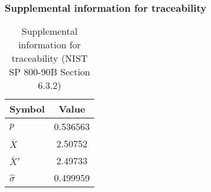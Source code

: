\documentclass[a3paper,xelatex,english]{bxjsarticle}
\begin{document}
\subsubsection{Supplemental information for traceability}
\renewcommand{\arraystretch}{1.8}
\begin{table}[h]
\caption{Supplemental information for traceability (NIST SP 800-90B Section 6.3.2)}
\begin{center}
\begin{tabular}{|l|c|}
\hline 
\rowcolor{anotherlightblue} %
Symbol				& Value \\ \hline 
$p$				& 0.536563\\ \hline 
$\bar{X}$ 		&  2.50752\\ \hline
$\bar{X}'$		&  2.49733\\ \hline
$\hat{\sigma}$		& 0.499959\\ \hline
\end{tabular}
\end{center}
\end{table}
\renewcommand{\arraystretch}{1.4}
\clearpage
\end{document}
